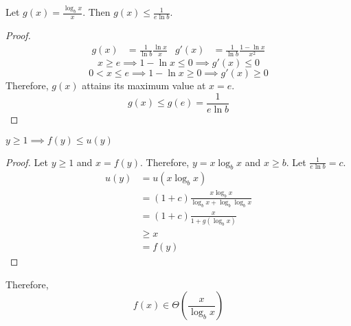 \begin{lemma}
\label{thm:lem1}
Let $g(x) = \frac{\log_b x}{x}$. Then $g(x) \le \frac{1}{e\ln b}$.
\end{lemma}
\begin{proof}
\begin{align*}
g(x) &= \frac{1}{\ln b} \frac{\ln x}{x}
& g'(x) &= \frac{1}{\ln b} \frac{1-\ln x}{x^2}
\end{align*}
\[ x \ge e \implies 1-\ln x \le 0 \implies g'(x) \le 0 \]
\[ 0 < x \le e \implies 1-\ln x \ge 0 \implies g'(x) \ge 0 \]
Therefore, $g(x)$ attains its maximum value at $x = e$.
\[ g(x) \le g(e) = \frac{1}{e\ln b} \]
\end{proof}

\begin{theorem}
$y \ge 1 \implies f(y) \le u(y)$
\end{theorem}
\begin{proof}
Let $y \ge 1$ and $x = f(y)$. Therefore, $y = x\log_b x$ and $x \ge b$.
Let $\frac{1}{e\ln b} = c$.
\begin{align*}
u(y) &= u(x\log_b x)
\\ &= (1+c)\frac{x\log_b x}{\log_b x + \log_b \log_b x}
\\ &= (1+c)\frac{x}{1 + g(\log_b x)}
\\ &\ge x \tag{$x \ge 0$ and $g(\log_b x) \le c$}
\\ &= f(y)
\end{align*}
\end{proof}

Therefore,
\[ f(x) \in \Theta\left(\frac{x}{\log_b x}\right) \]




